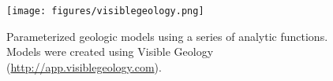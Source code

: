 \begin{figure}[!htbp]
\begin{center}
\texttt{[image: figures/visiblegeology.png]}
\end{center}
\caption{
Parameterized geologic models using a series of analytic functions. Models were created using Visible Geology (\url{http://app.visiblegeology.com}).
}
\label{fig:visiblegeology}
\end{figure}
